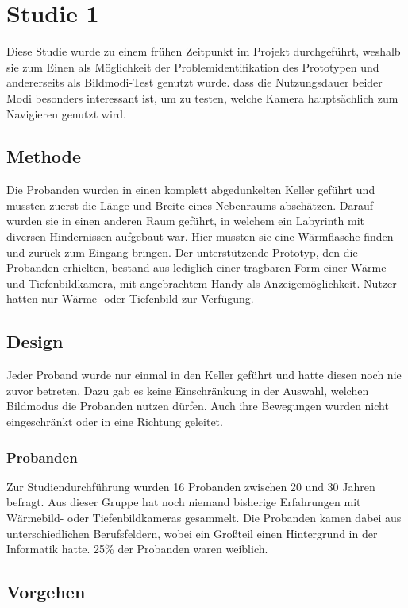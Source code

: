 \section{Studie 1}
Diese Studie wurde zu einem frühen Zeitpunkt im Projekt durchgeführt, weshalb sie zum Einen als Möglichkeit der Problemidentifikation des Prototypen und andererseits als Bildmodi-Test genutzt wurde.
\Dh dass die Nutzungsdauer beider Modi besonders interessant ist, um zu testen, welche Kamera hauptsächlich zum Navigieren genutzt wird.

\subsection{Methode}
Die Probanden wurden in einen komplett abgedunkelten Keller geführt und mussten zuerst die Länge und Breite eines Nebenraums abschätzen.
Darauf wurden sie in einen anderen Raum geführt, in welchem ein Labyrinth mit diversen Hindernissen aufgebaut war.
Hier mussten sie eine Wärmflasche finden und zurück zum Eingang bringen.
Der unterstützende Prototyp, den die Probanden erhielten, bestand aus lediglich einer tragbaren Form einer Wärme- und Tiefenbildkamera, mit angebrachtem Handy als Anzeigemöglichkeit.
Nutzer hatten nur Wärme- oder Tiefenbild zur Verfügung.

\subsection{Design}
Jeder Proband wurde nur einmal in den Keller geführt und hatte diesen noch nie zuvor betreten.
Dazu gab es keine Einschränkung in der Auswahl, welchen Bildmodus die Probanden nutzen dürfen.
Auch ihre Bewegungen wurden nicht eingeschränkt oder in eine Richtung geleitet.

\subsubsection{Probanden}
Zur Studiendurchführung wurden 16 Probanden zwischen 20 und 30 Jahren befragt.
Aus dieser Gruppe hat noch niemand bisherige Erfahrungen mit Wärmebild- oder Tiefenbildkameras gesammelt.
Die Probanden kamen dabei aus unterschiedlichen Berufsfeldern, wobei ein Großteil einen Hintergrund in der Informatik hatte.
25\% der Probanden waren weiblich.

\subsection{Vorgehen}

